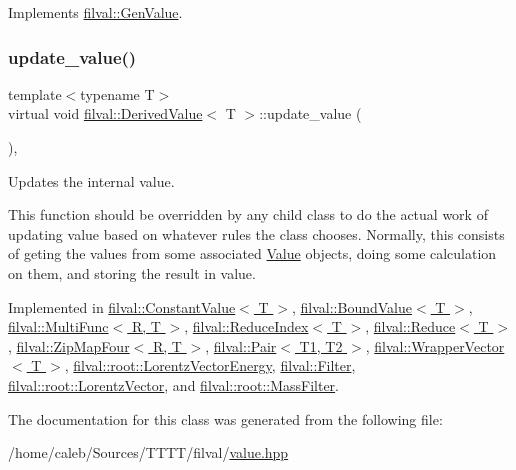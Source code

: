 Implements \hyperlink{classfilval_1_1GenValue_ae9d5bd9fde2d04f6cd05d5b901a8c78a}{filval\+::\+Gen\+Value}.

\hypertarget{classfilval_1_1DerivedValue_a74e04450a550454510329a9e6b941304}{}\label{classfilval_1_1DerivedValue_a74e04450a550454510329a9e6b941304} 
\subsubsection{\texorpdfstring{update\+\_\+value()}{update\_value()}}
{\footnotesize\ttfamily template$<$typename T$>$ \\
virtual void \hyperlink{classfilval_1_1DerivedValue}{filval\+::\+Derived\+Value}$<$ T $>$\+::update\+\_\+value (\begin{DoxyParamCaption}{ }\end{DoxyParamCaption})\hspace{0.3cm}{\ttfamily [protected]}, {}}



Updates the internal value. 

This function should be overridden by any child class to do the actual work of updating value based on whatever rules the class chooses. Normally, this consists of geting the values from some associated \hyperlink{classfilval_1_1Value}{Value} objects, doing some calculation on them, and storing the result in value. 

Implemented in \hyperlink{classfilval_1_1ConstantValue_a2814dd032b5688fc91e844f1592d1b09}{filval\+::\+Constant\+Value$<$ T $>$}, \hyperlink{classfilval_1_1BoundValue_a90be966f85204cac57075e4ee66f2fa9}{filval\+::\+Bound\+Value$<$ T $>$}, \hyperlink{classfilval_1_1MultiFunc_ad8552619e8a9d32401fb7ec84532648b}{filval\+::\+Multi\+Func$<$ R, T $>$}, \hyperlink{classfilval_1_1ReduceIndex_a9c842f80d772c4c77cd3fe132a0f8730}{filval\+::\+Reduce\+Index$<$ T $>$}, \hyperlink{classfilval_1_1Reduce_a7f6bc3bed99c9d41e045f675895d8f67}{filval\+::\+Reduce$<$ T $>$}, \hyperlink{classfilval_1_1ZipMapFour_a0a228a51d603e70af7db4fb27ed1c186}{filval\+::\+Zip\+Map\+Four$<$ R, T $>$}, \hyperlink{classfilval_1_1Pair_a1dd5b3859d023821081659cc8a66bda4}{filval\+::\+Pair$<$ T1, T2 $>$}, \hyperlink{classfilval_1_1WrapperVector_a959d593dca6d6a7ef7ed2ff3c4f28632}{filval\+::\+Wrapper\+Vector$<$ T $>$}, \hyperlink{classfilval_1_1root_1_1LorentzVectorEnergy_acb8982a0909dbb00a5ff4c38047d5115}{filval\+::root\+::\+Lorentz\+Vector\+Energy}, \hyperlink{classfilval_1_1Filter_ac91ccc66b66c8ea8cdad27fd9b4b62e2}{filval\+::\+Filter}, \hyperlink{classfilval_1_1root_1_1LorentzVector_aed3e0cbb782c738e5704188e9fae8b17}{filval\+::root\+::\+Lorentz\+Vector}, and \hyperlink{classfilval_1_1root_1_1MassFilter_a7858ca9aab96796fdb071b9ed55c5745}{filval\+::root\+::\+Mass\+Filter}.



The documentation for this class was generated from the following file\+:\begin{DoxyCompactItemize}
\item 
/home/caleb/\+Sources/\+T\+T\+T\+T/filval/\hyperlink{value_8hpp}{value.\+hpp}\end{DoxyCompactItemize}
